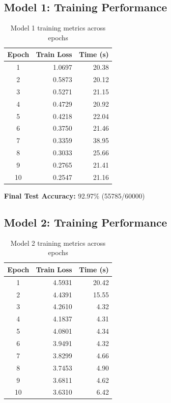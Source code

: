 \documentclass[11pt,a4paper]{article}
\begin{document}
\subsection{Model 1: Training Performance}
\begin{table}[H]
\centering
\begin{tabular}{crr}
\toprule
\textbf{Epoch} & \textbf{Train Loss} & \textbf{Time (s)} \\
\midrule
1 & 1.0697 & 20.38 \\
2 & 0.5873 & 20.12 \\
3 & 0.5271 & 21.15 \\
4 & 0.4729 & 20.92 \\
5 & 0.4218 & 22.04 \\
6 & 0.3750 & 21.46 \\
7 & 0.3359 & 38.95 \\
8 & 0.3033 & 25.66 \\
9 & 0.2765 & 21.41 \\
10 & 0.2547 & 21.16 \\
\bottomrule
\end{tabular}
\caption{Model 1 training metrics across epochs}
\end{table}

\textbf{Final Test Accuracy:} 92.97\% (55785/60000)

\subsection{Model 2: Training Performance}
\begin{table}[H]
\centering
\begin{tabular}{crr}
\toprule
\textbf{Epoch} & \textbf{Train Loss} & \textbf{Time (s)} \\
\midrule
1 & 4.5931 & 20.42 \\
2 & 4.4391 & 15.55 \\
3 & 4.2610 & 4.32 \\
4 & 4.1837 & 4.31 \\
5 & 4.0801 & 4.34 \\
6 & 3.9491 & 4.32 \\
7 & 3.8299 & 4.66 \\
8 & 3.7453 & 4.90 \\
9 & 3.6811 & 4.62 \\
10 & 3.6310 & 6.42 \\
\bottomrule
\end{tabular}
\caption{Model 2 training metrics across epochs}
\end{table}
\end{document}
